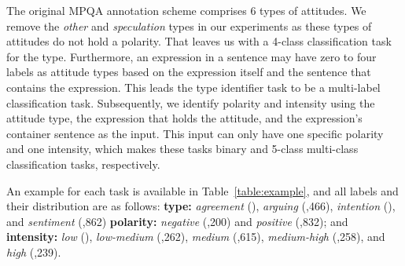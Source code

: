 \documentclass[11pt]{article}
\theoremstyle{definition}
\begin{document}
\begin{table}[hbt]
\centering
{}
\caption{The examples for Type (T), Polarity (P), and Intensity (I) tasks. The expressions within the sentences are in bold.}
\label{table:example}
\end{table}

The original MPQA annotation scheme comprises 6 types of attitudes. We remove the \textit{other} and \textit{speculation} types in our experiments as these types of attitudes do not hold a polarity. That leaves us with a 4-class classification task for the type.
Furthermore, an expression in a sentence may have zero to four labels as attitude types based on the expression itself and the sentence that contains the expression. This leads the type identifier task to be a multi-label classification task.
Subsequently, we identify polarity and intensity using the attitude type, the expression that holds the attitude, and the expression's container sentence as the input. This input can only have one specific polarity and one intensity, which makes these tasks {binary} and 5-class multi-class classification tasks, respectively.

An example for each task is available in Table~\ref{table:example}, and all labels and their distribution are as follows: \textbf{type:} {\em agreement} {\small ()}, {\em arguing} {\small (,466)}, {\em intention} {\small ()}, and {\em sentiment} {\small (,862)}\; \textbf{polarity:} {\em negative} {\small (,200)} and {\em positive} {\small (,832)}; and \textbf{intensity:} {\em low} {\small()}, {\em low-medium} {\small(,262)}, {\em medium} {\small (,615)}, {\em medium-high} {\small (,258)}, and {\em high} {\small (,239)}.
\end{document}

